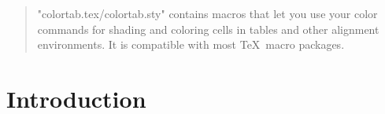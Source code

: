 \def\n#1{{\tt\string#1}}

\newcommand{\vitem}{\SaveVerb[{\def\bf{}\item[\UseVerb{\MyTemp}]}]{\MyTemp}}



\renewcommand{\EveryVerbatimLine}[2]{}

\renewcommand{\EveryVerbOutLine}[2]{}

\newcommand{\BeginExample}{%
  \VerbatimEnvironment\begin{VerbatimOut}{\jobname.tmp}}

\newcommand{\EndExample}{%
  \end{VerbatimOut}%
  \renewcommand{\EveryVerbatimLine}{}%
  \renewcommand{\EveryVerbatimCodes}{\catcode`\"=14}%
  \LVerbatimInput{\jobname.tmp}%
  \catcode`\"=9}

%
  {}

\if@test

\newenvironment{example}{\BeginExample}{\EndExample
  \begin{center}\leavevmode\end{center}}

\else

\newenvironment{example}{\VerbatimEnvironment\LVerbatim}{\endLVerbatim}

\fi

\makeatother



\maketitle

\begin{quote}
"colortab.tex/colortab.sty" contains macros that let you use your color
commands for shading and coloring cells in tables and other alignment
environments. It is compatible with most \TeX\ macro packages.
\end{quote}

\tableofcontents

\section{Introduction}

